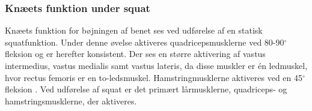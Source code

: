 \subsubsection{Knæets funktion under squat}
Knæets funktion for bøjningen af benet ses ved udførelse af en statisk squatfunktion. Under denne øvelse aktiveres quadricepsmusklerne ved 80-90$^{\circ}$ fleksion og er herefter konsistent. Der ses en større aktivering af vastus intermedius, vastus medialis samt vastus lateris, da disse muskler er én ledmuskel, hvor rectus femoris er en to-ledsmuskel. Hamstringmusklerne aktiveres ved en 45$^{\circ}$ fleksion \citep{schoenfeld2010}.
Ved udførelse af squat er det primært lårmusklerne, quadriceps- og hamstringsmusklerne, der aktiveres. 



